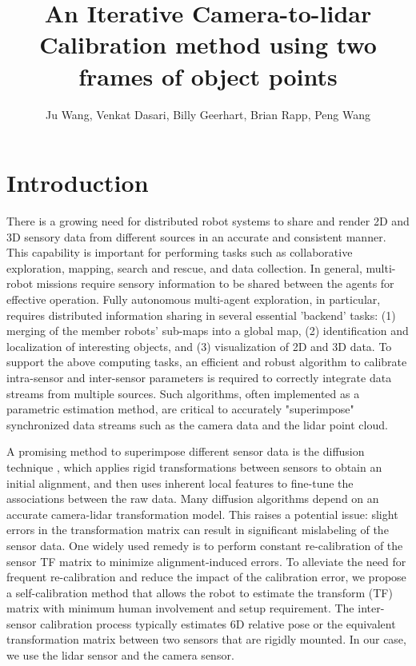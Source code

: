 \documentclass{article}
\title{ An Iterative Camera-to-lidar Calibration method using two frames of object points}
\author{Ju Wang, Venkat Dasari, Billy Geerhart, Brian Rapp, Peng Wang }
\begin{document}
\maketitle

\section{Introduction}

\noindent

There is a growing need for distributed robot systems to share and render 2D and 3D sensory data from different sources in an accurate and consistent manner. This capability is important for performing tasks such as collaborative exploration, mapping,
search and rescue, and data collection. 
In general, multi-robot missions require sensory information to be shared between
the agents for effective operation. Fully autonomous multi-agent
exploration, in particular, requires distributed information sharing in several essential 'backend' tasks: (1) merging of the member robots' sub-maps into a global map, (2) identification and localization of interesting objects, and (3) visualization of 2D and 3D data. To support the above computing tasks, an efficient and robust algorithm to calibrate intra-sensor and inter-sensor parameters is required to correctly integrate data streams from multiple sources. 
Such algorithms,  often implemented as a parametric estimation method, are critical to accurately "superimpose" synchronized data streams such as the camera data and the lidar point cloud.

A promising method to superimpose different sensor data is the diffusion technique \cite{wang2019ldls}, which applies rigid transformations between sensors to obtain an initial alignment, and then uses inherent local features to fine-tune the associations between the raw data. 
Many diffusion algorithms depend on an accurate camera-lidar transformation model. This raises a potential issue: slight errors in the transformation matrix can result in significant mislabeling of the sensor data. One widely used remedy is to perform constant re-calibration of the sensor TF matrix to minimize alignment-induced errors. To alleviate the need for frequent re-calibration and reduce the impact of the calibration error, we propose a self-calibration method that allows the robot to estimate the transform (TF) matrix with minimum human involvement and setup requirement. The inter-sensor calibration process typically estimates 6D relative pose or the equivalent transformation matrix between two sensors that are rigidly mounted. In our case, we use the lidar sensor and the camera sensor.
\end{document}
